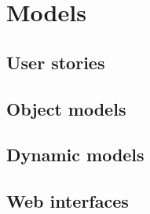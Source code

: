 \section{Models}

\subsection{User stories}

\subsection{Object models}

\subsection{Dynamic models}

\subsection{Web interfaces}